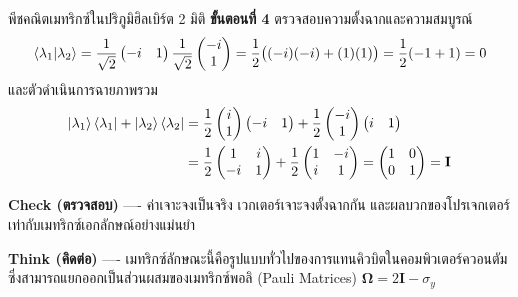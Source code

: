 \begin{psctbox}{พีชคณิตเมทริกซ์ในปริภูมิฮิลเบิร์ต 2 มิติ}
\textbf{ขั้นตอนที่ 4} ตรวจสอบความตั้งฉากและความสมบูรณ์
\begin{equation*}
\braket{\lambda_1}{\lambda_2} = \frac{1}{\sqrt{2}}\begin{pmatrix} -i & 1 \end{pmatrix} \frac{1}{\sqrt{2}}\begin{pmatrix} -i \\ 1 \end{pmatrix} = \frac{1}{2}\big( (-i)(-i) + (1)(1) \big) = \frac{1}{2}(-1 + 1) = 0
\end{equation*}
และตัวดำเนินการฉายภาพรวม
\begin{align*}
\ket{\lambda_1}\bra{\lambda_1} + \ket{\lambda_2}\bra{\lambda_2} &= \frac{1}{2}\begin{pmatrix} i \\ 1 \end{pmatrix}\begin{pmatrix} -i & 1 \end{pmatrix} + \frac{1}{2}\begin{pmatrix} -i \\ 1 \end{pmatrix}\begin{pmatrix} i & 1 \end{pmatrix} \\
&= \frac{1}{2}\begin{pmatrix} 1 & i \\ -i & 1 \end{pmatrix} + \frac{1}{2}\begin{pmatrix} 1 & -i \\ i & 1 \end{pmatrix} = \begin{pmatrix} 1 & 0 \\ 0 & 1 \end{pmatrix} = \mathbf{I}
\end{align*}

\textbf{Check (ตรวจสอบ)} ---- ค่าเจาะจงเป็นจริง เวกเตอร์เจาะจงตั้งฉากกัน และผลบวกของโปรเจกเตอร์เท่ากับเมทริกซ์เอกลักษณ์อย่างแม่นยำ

\textbf{Think (คิดต่อ)} ---- เมทริกซ์ลักษณะนี้คือรูปแบบทั่วไปของการแทนคิวบิตในคอมพิวเตอร์ควอนตัม ซึ่งสามารถแยกออกเป็นส่วนผสมของเมทริกซ์พอลิ (Pauli Matrices) $\boldsymbol{\Omega} = 2\mathbf{I} - \sigma_y$
\end{psctbox}

